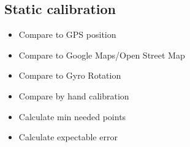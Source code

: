 
\subsection{Static calibration}
\begin{itemize}
    \item Compare to GPS position
    \item Compare to Google Maps/Open Street Map
    \item Compare to Gyro Rotation
    \item Compare by hand calibration
    \item Calculate min needed points
    \item Calculate expectable error
\end{itemize}